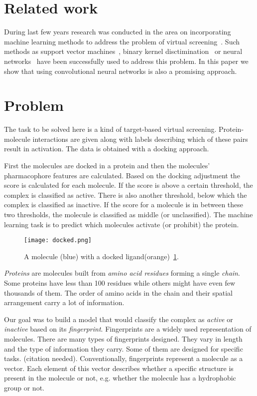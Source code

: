 \documentclass[a4paper,10pt]{report}
\begin{document}
    \section{Related work}
    During last few years research was conducted in the area on incorporating machine learning methods to address the problem of virtual screening~\cite{kernel_biology, evaluation2007, MLforINSilicio}. Such methods as support vector machines~\cite{SVM}, binary kernel disctimination~\cite{BKD} or neural networks~\cite{NN_VS} have been successfully used to address this problem. In this paper we show that using convolutional neural networks is also a promising approach.

    \section{Problem}\label{sec:PROBLEM}
    The task to be solved here is a kind of target-based virtual screening. Protein-molecule interactions are given along with labels describing which of these pairs result in activation. The data is obtained with a docking approach.
    
    First the molecules are docked in a protein and then the molecules' pharmacophore features are calculated. Based on the docking adjustment the score is calculated for each molecule. If the score is above a certain threshold, the complex is classified as active. There is also another threshold, below which the complex is classified as inactive. If the score for a molecule is in between these two thresholds, the molecule is classified as middle (or unclassified). The machine learning task is to predict which molecules activate (or prohibit) the protein.
    
    \begin{figure}[h!]
	  \centering
	  \texttt{[image: docked.png]}
	  \caption{A molecule (blue) with a docked ligand(orange)~\ref{docked}.}
	  \label{docked}
    \end{figure} 
    
    \emph{Proteins} are molecules built from \emph{amino acid residues} forming a single \emph{chain}. Some proteins have less than 100 residues while others might have even few thousands of them. The order of amino acids in the chain and their spatial arrangement carry a lot of information. 
    
    Our goal was to build a model that would classify the complex as \emph{active} or \emph{inactive} based on its \emph{fingerprint}. Fingerprints are a widely used representation of molecules. There are many types of fingerprints designed. They vary in length and the type of information they carry. Some of them are designed for specific tasks. (citation needed). Conventionally, fingerprints represent a molecule as a vector. Each element of this vector describes whether a specific structure is present in the molecule or not, e.g. whether the molecule has a hydrophobic group or not. 
        
\end{document}
